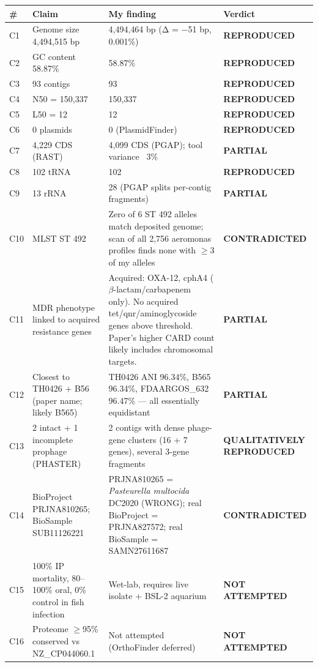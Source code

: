 \documentclass[10pt]{article}
\newcommand{\repl}{{\color{green!50!black}\textbf{REPRODUCED}}}
\newcommand{\part}{{\color{orange!80!black}\textbf{PARTIAL}}}
\newcommand{\contra}{{\color{red!80!black}\textbf{CONTRADICTED}}}
\newcommand{\qual}{{\color{blue!70!black}\textbf{QUALITATIVELY REPRODUCED}}}
\newcommand{\nope}{{\color{gray}\textbf{NOT ATTEMPTED}}}
\begin{document}
\begin{longtable}{@{}p{0.5cm}p{7cm}p{4cm}p{4cm}@{}}
\toprule
\# & Claim & My finding & Verdict \\
\midrule
\endhead

C1 & Genome size 4{,}494{,}515 bp & 4{,}494{,}464 bp (Δ = −51 bp, 0.001\%) & \repl \\
C2 & GC content 58.87\% & 58.87\% & \repl \\
C3 & 93 contigs & 93 & \repl \\
C4 & N50 = 150{,}337 & 150{,}337 & \repl \\
C5 & L50 = 12 & 12 & \repl \\
C6 & 0 plasmids & 0 (PlasmidFinder) & \repl \\
C7 & 4{,}229 CDS (RAST) & 4{,}099 CDS (PGAP); tool variance ~3\% & \part \\
C8 & 102 tRNA & 102 & \repl \\
C9 & 13 rRNA & 28 (PGAP splits per-contig fragments) & \part \\
C10 & MLST ST 492 & Zero of 6 ST 492 alleles match deposited genome; scan of all 2{,}756 aeromonas profiles finds none with $\geq$3 of my alleles & \contra \\
C11 & MDR phenotype linked to acquired resistance genes & Acquired: OXA-12, cphA4 ($\beta$-lactam/carbapenem only). No acquired tet/qnr/aminoglycoside genes above threshold. Paper's higher CARD count likely includes chromosomal targets. & \part \\
C12 & Closest to TH0426 + B56 (paper name; likely B565) & TH0426 ANI 96.34\%, B565 96.34\%, FDAARGOS\_632 96.47\% --- all essentially equidistant & \part \\
C13 & 2 intact + 1 incomplete prophage (PHASTER) & 2 contigs with dense phage-gene clusters (16 + 7 genes), several 3-gene fragments & \qual \\
C14 & BioProject PRJNA810265; BioSample SUB11126221 & PRJNA810265 = \textit{Pasteurella multocida} DC2020 (WRONG); real BioProject = PRJNA827572; real BioSample = SAMN27611687 & \contra \\
C15 & 100\% IP mortality, 80--100\% oral, 0\% control in fish infection & Wet-lab, requires live isolate + BSL-2 aquarium & \nope \\
C16 & Proteome $\geq$95\% conserved vs NZ\_CP044060.1 & Not attempted (OrthoFinder deferred) & \nope \\

\bottomrule
\end{longtable}
\end{document}
